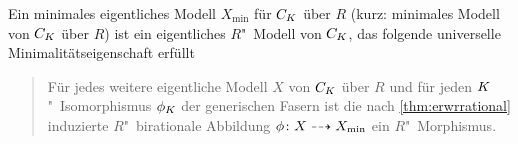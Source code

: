 \begin{Definition}
  Ein minimales eigentliches Modell $X_{\text{min}}$ für $C_{K}$ über
  $R$ (kurz: minimales Modell von $C_{K}$ über $R$) ist ein
  eigentliches $R$"~Modell von $C_{K}$, das folgende universelle
  Minimalitätseigenschaft erfüllt
  \begin{quote}
    Für jedes weitere eigentliche Modell $X$ von
    $C_{K}$ über $R$ und für jeden $K$"~Isomorphismus $\phi_{K}$ der
    generischen Fasern ist die nach \ref{thm:erwrrational}
    induzierte $R$"~birationale Abbildung $\phi\colon X\dashrightarrow
    X_{\text{min}}$ ein $R$"~Morphismus.
  \end{quote}
\end{Definition}

